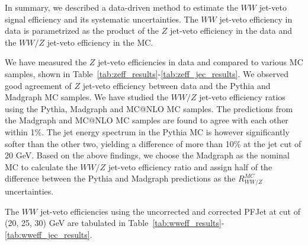 In summary, we described a data-driven method to estimate the $WW$ 
jet-veto signal efficiency and its systematic uncertainties. 
The $WW$ jet-veto efficiency in data is parametrized as the product 
of the $Z$ jet-veto efficiency in the data and the $WW/Z$ jet-veto efficiency 
in the MC. 

We have measured the $Z$ jet-veto efficiencies in data and 
compared to various MC samples, shown in 
Table~\ref{tab:zeff_results}-\ref{tab:zeff_jec_results}. 
We observed good agreement of $Z$ jet-veto efficiency 
between data and the Pythia and Madgraph MC samples. 
We have studied the $WW/Z$ jet-veto efficiency ratios using the 
Pythia, Madgraph and MC@NLO MC samples. 
The predictions from the Madgraph and MC@NLO MC samples are 
found to agree with each other within 1\%. 
The jet energy spectrum in the Pythia MC is however significantly softer 
than the other two, yielding a difference of more than 10\% at 
the jet \pt cut of 20 GeV. 
Based on the above findings, we choose the Madgraph as the 
nominal MC to calculate the $WW/Z$ jet-veto efficiency ratio 
and assign half of the difference between the Pythia and Madgraph 
predictions as the $R_{WW/Z}^{MC}$ uncertainties. 

The $WW$ jet-veto efficiencies using the uncorrected and 
corrected PFJet at \pt cut of (20, 25, 30) GeV are tabulated 
in Table~\ref{tab:wweff_results}-\ref{tab:wweff_jec_results}. 








